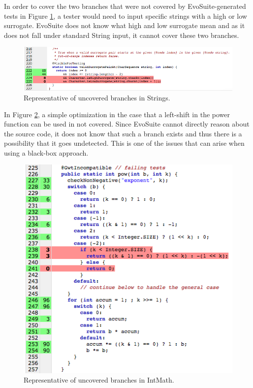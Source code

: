 In order to cover the two branches that were not covered by EvoSuite-generated tests in Figure \ref{fig:StringsAnalysis}, a tester would need to input specific strings with a high or low surrogate. 
EvoSuite does not know what high and low surrogate mean and as it does not fall under standard String input, it cannot cover these two branches. 

\begin{figure}
\centering
\begin{minipage}[c]{\textwidth}
        \includegraphics[width=.9\textwidth]{CoverageAnalysis/Strings.png}
    \caption{Representative of uncovered branches in Strings.}
    \label{fig:StringsAnalysis}
    \vspace{.5cm}
\end{minipage}
\end{figure}

In Figure \ref{fig:IntMathAnalysis}, a simple optimization in the case that a left-shift in the power function can be used in not covered.
Since EvoSuite cannot directly reason about the source code, it does not know that such a branch exists and thus there is a possibility that it goes undetected.
This is one of the issues that can arise when using a black-box approach.

\begin{figure}
\centering
\begin{minipage}[c]{\textwidth}
        \includegraphics[width=.65\textwidth]{CoverageAnalysis/IntMath.png}
    \caption{Representative of uncovered branches in IntMath.}
    \label{fig:IntMathAnalysis}
    \vspace{.5cm}
\end{minipage}
\end{figure}
